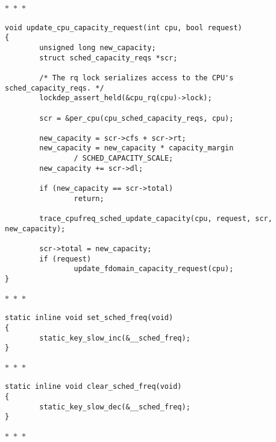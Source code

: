 \documentclass{article}
\newcommand{\divider}{{\begin{center}
  $\ast$~$\ast$~$\ast$
\end{center}}}
\begin{document}
\divider
\begin{verbatim}
void update_cpu_capacity_request(int cpu, bool request)
{
        unsigned long new_capacity;
        struct sched_capacity_reqs *scr;

        /* The rq lock serializes access to the CPU's sched_capacity_reqs. */
        lockdep_assert_held(&cpu_rq(cpu)->lock);

        scr = &per_cpu(cpu_sched_capacity_reqs, cpu);

        new_capacity = scr->cfs + scr->rt;
        new_capacity = new_capacity * capacity_margin
                / SCHED_CAPACITY_SCALE;
        new_capacity += scr->dl;

        if (new_capacity == scr->total)
                return;

        trace_cpufreq_sched_update_capacity(cpu, request, scr, new_capacity);

        scr->total = new_capacity;
        if (request)
                update_fdomain_capacity_request(cpu);
}
\end{verbatim}
\divider
\begin{verbatim}
static inline void set_sched_freq(void)
{
        static_key_slow_inc(&__sched_freq);
}
\end{verbatim}
\divider
\begin{verbatim}
static inline void clear_sched_freq(void)
{
        static_key_slow_dec(&__sched_freq);
}
\end{verbatim}
\divider
\end{document}
